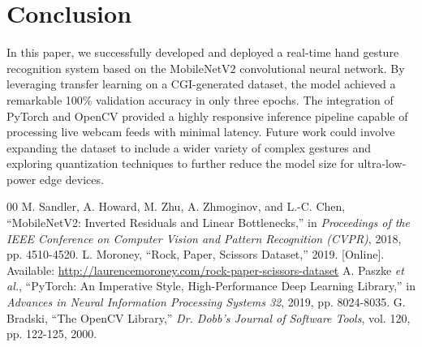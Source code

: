 \documentclass[conference]{IEEEtran}
\begin{document}
\section{Conclusion}
In this paper, we successfully developed and deployed a real-time hand gesture recognition system based on the MobileNetV2 convolutional neural network. By leveraging transfer learning on a CGI-generated dataset, the model achieved a remarkable 100\% validation accuracy in only three epochs. The integration of PyTorch and OpenCV provided a highly responsive inference pipeline capable of processing live webcam feeds with minimal latency. Future work could involve expanding the dataset to include a wider variety of complex gestures and exploring quantization techniques to further reduce the model size for ultra-low-power edge devices.

\begin{thebibliography}{00}
 M. Sandler, A. Howard, M. Zhu, A. Zhmoginov, and L.-C. Chen, ``MobileNetV2: Inverted Residuals and Linear Bottlenecks,'' in \emph{Proceedings of the IEEE Conference on Computer Vision and Pattern Recognition (CVPR)}, 2018, pp. 4510-4520.
 L. Moroney, ``Rock, Paper, Scissors Dataset,'' 2019. [Online]. Available: \url{http://laurencemoroney.com/rock-paper-scissors-dataset}
 A. Paszke \textit{et al.}, ``PyTorch: An Imperative Style, High-Performance Deep Learning Library,'' in \emph{Advances in Neural Information Processing Systems 32}, 2019, pp. 8024-8035.
 G. Bradski, ``The OpenCV Library,'' \emph{Dr. Dobb's Journal of Software Tools}, vol. 120, pp. 122-125, 2000.
\end{thebibliography}
\end{document}
